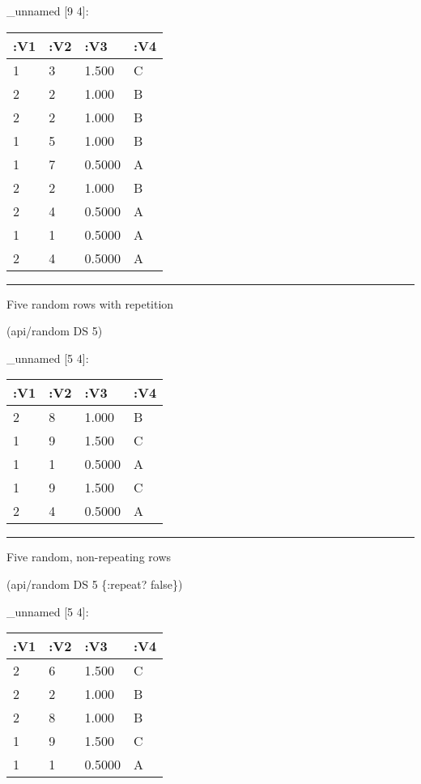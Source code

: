 \documentclass[]{article}
\newenvironment{Shaded}{\begin{snugshade}}{\end{snugshade}}
\newcommand{\DecValTok}[1]{\textcolor[rgb]{0.00,0.00,0.81}{#1}}
\newcommand{\VariableTok}[1]{\textcolor[rgb]{0.00,0.00,0.00}{#1}}
\newcommand{\AttributeTok}[1]{\textcolor[rgb]{0.77,0.63,0.00}{#1}}
\newcommand{\NormalTok}[1]{#1}
\begin{document}
\_unnamed {[}9 4{]}:

\begin{longtable}[]{@{}llll@{}}
\toprule
:V1 & :V2 & :V3 & :V4\tabularnewline
\midrule
\endhead
1 & 3 & 1.500 & C\tabularnewline
2 & 2 & 1.000 & B\tabularnewline
2 & 2 & 1.000 & B\tabularnewline
1 & 5 & 1.000 & B\tabularnewline
1 & 7 & 0.5000 & A\tabularnewline
2 & 2 & 1.000 & B\tabularnewline
2 & 4 & 0.5000 & A\tabularnewline
1 & 1 & 0.5000 & A\tabularnewline
2 & 4 & 0.5000 & A\tabularnewline
\bottomrule
\end{longtable}

\begin{center}\rule{0.5\linewidth}{0.5pt}\end{center}

Five random rows with repetition

\begin{Shaded}
\begin{Highlighting}[]
\NormalTok{(api/random DS }\DecValTok{5}\NormalTok{)}
\end{Highlighting}
\end{Shaded}

\_unnamed {[}5 4{]}:

\begin{longtable}[]{@{}llll@{}}
\toprule
:V1 & :V2 & :V3 & :V4\tabularnewline
\midrule
\endhead
2 & 8 & 1.000 & B\tabularnewline
1 & 9 & 1.500 & C\tabularnewline
1 & 1 & 0.5000 & A\tabularnewline
1 & 9 & 1.500 & C\tabularnewline
2 & 4 & 0.5000 & A\tabularnewline
\bottomrule
\end{longtable}

\begin{center}\rule{0.5\linewidth}{0.5pt}\end{center}

Five random, non-repeating rows

\begin{Shaded}
\begin{Highlighting}[]
\NormalTok{(api/random DS }\DecValTok{5}\NormalTok{ \{}\AttributeTok{:repeat}\NormalTok{? }\VariableTok{false}\NormalTok{\})}
\end{Highlighting}
\end{Shaded}

\_unnamed {[}5 4{]}:

\begin{longtable}[]{@{}llll@{}}
\toprule
:V1 & :V2 & :V3 & :V4\tabularnewline
\midrule
\endhead
2 & 6 & 1.500 & C\tabularnewline
2 & 2 & 1.000 & B\tabularnewline
2 & 8 & 1.000 & B\tabularnewline
1 & 9 & 1.500 & C\tabularnewline
1 & 1 & 0.5000 & A\tabularnewline
\bottomrule
\end{longtable}
\end{document}
